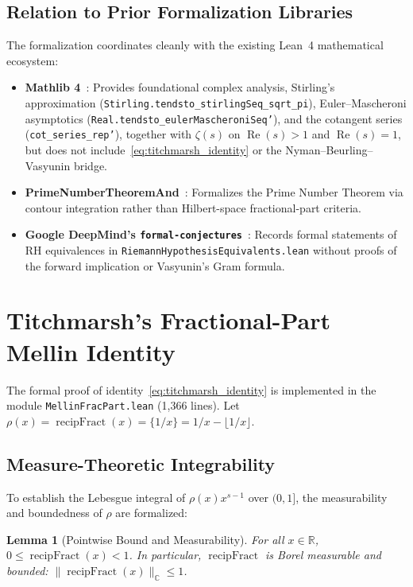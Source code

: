 \documentclass[11pt,a4paper]{article}
\newtheorem{lemma}[theorem]{Lemma}
\theoremstyle{definition}
\newcommand{\Rset}{\mathbb{R}}
\newcommand{\Cfield}{\mathbb{C}}
\begin{document}
\subsection{Relation to Prior Formalization Libraries}

The formalization coordinates cleanly with the existing Lean~4 mathematical ecosystem:
\begin{itemize}[leftmargin=1.5em,noitemsep]
  \item \textbf{Mathlib 4}~\cite{Mathlib}: Provides foundational complex analysis, Stirling's approximation (\texttt{Stirling.\allowbreak tendsto\_\allowbreak stirling\allowbreak Seq\_\allowbreak sqrt\_\allowbreak pi}), Euler--Mascheroni asymptotics (\texttt{Real.\allowbreak tendsto\_\allowbreak euler\allowbreak Mascheroni\allowbreak Seq'}), and the cotangent series (\texttt{cot\_\allowbreak series\_\allowbreak rep'}), together with $\zeta(s)$ on $\operatorname{Re}(s) > 1$ and $\operatorname{Re}(s) = 1$, but does not include~\eqref{eq:titchmarsh_identity} or the Nyman--Beurling--Vasyunin bridge.
  \item \textbf{PrimeNumberTheoremAnd}~\cite{PNT}: Formalizes the Prime Number Theorem via contour integration rather than Hilbert-space fractional-part criteria.
  \item \textbf{Google DeepMind's \texttt{formal-conjectures}}~\cite{FormalConjectures}: Records formal statements of RH equivalences in \texttt{RiemannHypothesisEquivalents.lean} without proofs of the forward implication or Vasyunin's Gram formula.
\end{itemize}

\section{Titchmarsh's Fractional-Part Mellin Identity}

The formal proof of identity~\eqref{eq:titchmarsh_identity} is implemented in the module \texttt{MellinFracPart.lean} (1,366 lines). Let $\rho(x) = \operatorname{recipFract}(x) = \{1 / x\} = 1 / x - \lfloor 1 / x \rfloor$.

\subsection{Measure-Theoretic Integrability}

To establish the Lebesgue integral of $\rho(x) x^{s-1}$ over $(0, 1]$, the measurability and boundedness of $\rho$ are formalized:

\begin{lemma}[Pointwise Bound and Measurability]
For all $x \in \Rset$, $0 \le \operatorname{recipFract}(x) < 1$. In particular, $\operatorname{recipFract}$ is Borel measurable and bounded: $\|\operatorname{recipFract}(x)\|_{\Cfield} \le 1$.
\end{lemma}
\end{document}
